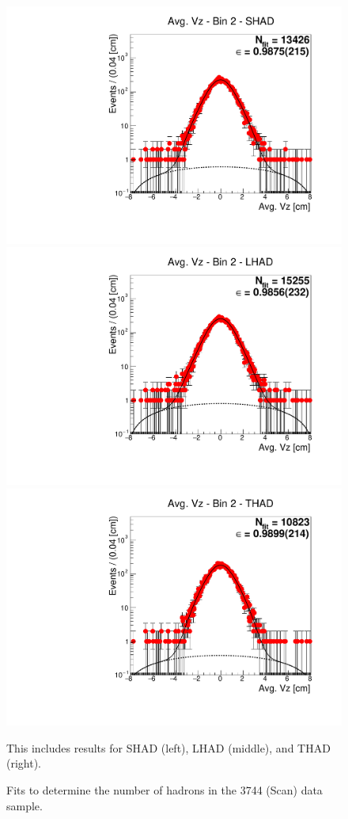 \begin{figure}[H]
\centering
\includegraphics[scale=0.25]{figures/plots/nonDDbar_fit_results/scan/fit_scan_02_data_SHAD.pdf}
\hspace{-0.5cm}
\includegraphics[scale=0.25]{figures/plots/nonDDbar_fit_results/scan/fit_scan_02_data_LHAD.pdf}
\hspace{-0.5cm}
\includegraphics[scale=0.25]{figures/plots/nonDDbar_fit_results/scan/fit_scan_02_data_THAD.pdf}
\caption{Fits to determine the number of hadrons in the 3744 (Scan) data sample.}
{This includes results for SHAD (left), LHAD (middle), and THAD (right).}
\label{fig:hadron_fits_scan_02}
\end{figure}

